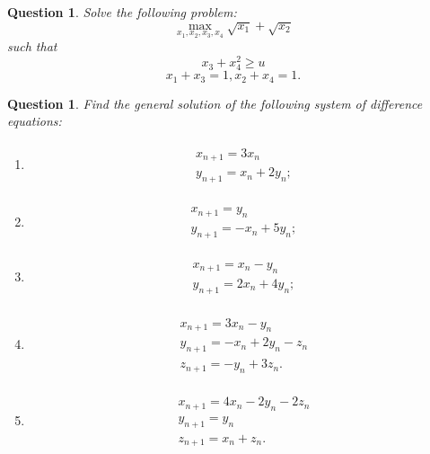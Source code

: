 \documentclass[12pt]{article}
\newtheorem{ques}[theorem]{Question}
\begin{document}
\newpage
\begin{ques}
Solve the following problem:
\[\max_{x_1,x_2, x_3, x_4} \sqrt{x_1}+\sqrt{ x_2}
\]
such that \[x_3+ x_4^2\geq u
\]\[x_1+x_3=1, x_2+x_4=1.
    \]
\end{ques}

\newpage
\begin{ques}
Find the general solution of the following system of difference equations:
\begin{enumerate}
    \item \begin{align*}
        \begin{array}{c}
             x_{n+1}=3x_n\\
             y_{n+1}=x_n+2y_n;
        \end{array}
    \end{align*}
    
     \item \begin{align*}
        \begin{array}{c}
             x_{n+1}=y_n\\
             y_{n+1}=-x_n+5y_n;
        \end{array}
    \end{align*}
     \item \begin{align*}
        \begin{array}{c}
             x_{n+1}=x_n-y_n\\
             y_{n+1}=2x_n+4y_n;
        \end{array}
    \end{align*}
    
     \item \begin{align*}
        \begin{array}{c}
             x_{n+1}=3x_n-y_n\\
             y_{n+1}=-x_n+2y_n-z_n\\
             z_{n+1}=-y_n+3z_n.
        \end{array}
    \end{align*}
      \item \begin{align*}
        \begin{array}{c}
             x_{n+1}=4x_n-2y_n-2z_n\\
             y_{n+1}=y_n\\
             z_{n+1}=x_n+z_n.
        \end{array}
    \end{align*}
\end{enumerate}
\end{ques}
\end{document}
